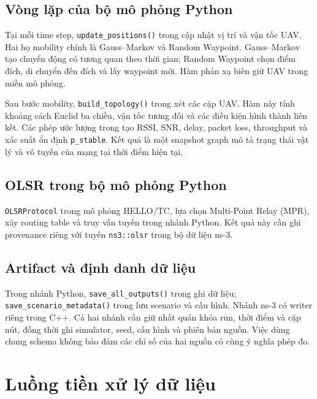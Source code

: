 \documentclass[12pt,a4paper]{article}
\newcommand{\code}[1]{{\small\texttt{#1}}}
\begin{document}
\subsection{Vòng lặp của bộ mô phỏng Python}

Tại mỗi time step, \code{update\_positions()} trong  cập nhật vị trí và vận tốc UAV. Hai họ mobility chính là Gauss--Markov và Random Waypoint. Gauss--Markov tạo chuyển động có tương quan theo thời gian; Random Waypoint chọn điểm đích, di chuyển đến đích và lấy waypoint mới. Hàm phản xạ biên giữ UAV trong miền mô phỏng.

Sau bước mobility, \code{build\_topology()} trong  xét các cặp UAV. Hàm này tính khoảng cách Euclid ba chiều, vận tốc tương đối và các điều kiện hình thành liên kết. Các phép ước lượng trong  tạo RSSI, SNR, delay, packet loss, throughput và xác suất ổn định \code{p\_stable}. Kết quả là một snapshot graph mô tả trạng thái vật lý và vô tuyến của mạng tại thời điểm hiện tại.

\subsection{OLSR trong bộ mô phỏng Python}

\code{OLSRProtocol} trong  mô phỏng HELLO/TC, lựa chọn Multi-Point Relay (MPR), xây routing table và truy vấn tuyến trong nhánh Python. Kết quả này cần ghi provenance riêng với tuyến \code{ns3::olsr} trong bộ dữ liệu ns-3.

\subsection{Artifact và định danh dữ liệu}

Trong nhánh Python, \code{save\_all\_outputs()} trong  ghi dữ liệu; \code{save\_scenario\_metadata()} trong  lưu scenario và cấu hình. Nhánh ns-3 có writer riêng trong C++. Cả hai nhánh cần giữ nhất quán khóa run, thời điểm và cặp nút, đồng thời ghi simulator, seed, cấu hình và phiên bản nguồn. Việc dùng chung schema không bảo đảm các chỉ số của hai nguồn có cùng ý nghĩa phép đo.

\section{Luồng tiền xử lý dữ liệu}
\label{sec:preprocessing}
\end{document}

